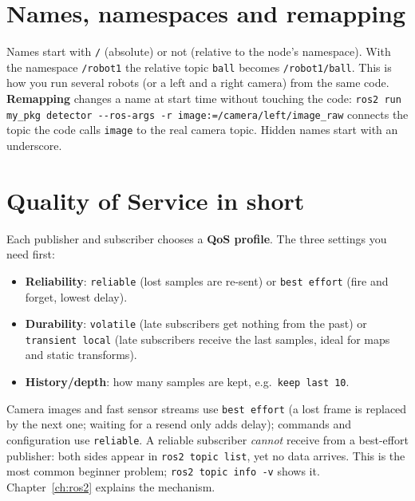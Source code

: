 \section*{Names, namespaces and remapping}
Names start with \verb!/! (absolute) or not (relative to the node's namespace). With the namespace \verb!/robot1! the relative topic \verb!ball! becomes \verb!/robot1/ball!. This is how you run several robots (or a left and a right camera) from the same code. \textbf{Remapping} changes a name at start time without touching the code: \verb!ros2 run my_pkg detector --ros-args -r image:=/camera/left/image_raw! connects the topic the code calls \verb!image! to the real camera topic. Hidden names start with an underscore.

\section*{Quality of Service in short}
Each publisher and subscriber chooses a \textbf{QoS profile}. The three settings you need first:
\begin{itemize}[nosep]
\item \textbf{Reliability}: \verb!reliable! (lost samples are re-sent) or \verb!best effort! (fire and forget, lowest delay).
\item \textbf{Durability}: \verb!volatile! (late subscribers get nothing from the past) or \verb!transient local! (late subscribers receive the last samples, ideal for maps and static transforms).
\item \textbf{History/depth}: how many samples are kept, e.g.\ \verb!keep last 10!.
\end{itemize}
Camera images and fast sensor streams use \verb!best effort! (a lost frame is replaced by the next one; waiting for a resend only adds delay); commands and configuration use \verb!reliable!. A reliable subscriber \emph{cannot} receive from a best-effort publisher: both sides appear in \verb!ros2 topic list!, yet no data arrives. This is the most common beginner problem; \verb!ros2 topic info -v! shows it. Chapter~\ref{ch:ros2} explains the mechanism.


